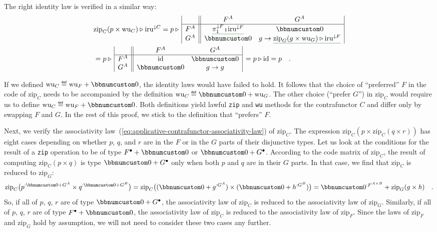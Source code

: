 The right identity law is verified in a similar way:
\begin{align*}
 & \text{zip}_{C}(p\times\text{wu}_{C})\triangleright\text{iru}^{\downarrow C}=p\triangleright\,\begin{array}{|c||cc|}
 & F^{A} & G^{A}\\
\hline F^{A} & \gunderline{\pi_{1}^{\downarrow F}\bef\text{iru}^{\downarrow F}} & \bbnum 0\\
G^{A} & \bbnum 0 & g\rightarrow\gunderline{\text{zip}_{G}(g\times\text{wu}_{G})\triangleright\text{iru}^{\downarrow F}}
\end{array}\\
 & =p\triangleright\,\begin{array}{|c||cc|}
 & F^{A} & G^{A}\\
\hline F^{A} & \text{id} & \bbnum 0\\
G^{A} & \bbnum 0 & g\rightarrow g
\end{array}\,=p\triangleright\text{id}=p\quad.
\end{align*}

If we defined $\text{wu}_{C}\triangleq\text{wu}_{F}+\bbnum 0$, the
identity laws would have failed to hold. It follows that the choice
of \textsf{``}preferred\textsf{''} $F$ in the code of $\text{zip}_{C}$ needs to
be accompanied by the definition $\text{wu}_{C}\triangleq\bbnum 0+\text{wu}_{G}$.
The other choice (\textsf{``}prefer $G$\textsf{''}) in $\text{zip}_{C}$ would require
us to define $\text{wu}_{C}\triangleq\text{wu}_{F}+\bbnum 0$. Both
definitions yield lawful \lstinline!zip! and \lstinline!wu! methods
for the contrafunctor $C$ and differ only by swapping $F$ and $G$.
In the rest of this proof, we stick to the definition that \textsf{``}prefers\textsf{''}
$F$.

Next, we verify the associativity law~(\ref{eq:applicative-contrafunctor-associativity-law})
of $\text{zip}_{C}$. The expression $\text{zip}_{C}(p\times\text{zip}_{C}(q\times r))$
has eight cases depending on whether $p$, $q$, and $r$ are in the
$F$ or in the $G$ parts of their disjunctive types. Let us look
at the conditions for the result of a \lstinline!zip! operation to
be of type $F^{\bullet}+\bbnum 0$ or $\bbnum 0+G^{\bullet}$. According
to the code matrix of $\text{zip}_{C}$, the result of computing $\text{zip}_{C}(p\times q)$
is type $\bbnum 0+G^{\bullet}$ only when both $p$ and $q$ are in
their $G$ parts. In that case, we find that $\text{zip}_{C}$ is
reduced to $\text{zip}_{G}$:
\[
\text{zip}_{C}\big(p^{:\bbnum 0+G^{A}}\times q^{:\bbnum 0+G^{B}}\big)=\text{zip}_{C}\big((\bbnum 0+g^{:G^{A}})\times(\bbnum 0+h^{:G^{B}})\big)=\bbnum 0^{:F^{A\times B}}+\text{zip}_{G}(g\times h)\quad.
\]
So, if all of $p$, $q$, $r$ are of type $\bbnum 0+G^{\bullet}$,
the associativity law of $\text{zip}_{C}$ is reduced to the associativity
law of $\text{zip}_{G}$. Similarly, if all of $p$, $q$, $r$ are
of type $F^{\bullet}+\bbnum 0$, the associativity law of $\text{zip}_{C}$
is reduced to the associativity law of $\text{zip}_{F}$. Since the
laws of $\text{zip}_{F}$ and $\text{zip}_{G}$ hold by assumption,
we will not need to consider these two cases any further. 


